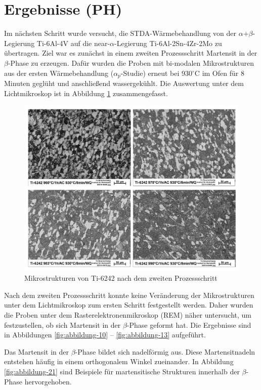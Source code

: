 \section{Ergebnisse (PH)}

Im nächsten Schritt wurde versucht, die STDA-Wärmebehandlung von der $\alpha$+$\beta$-Legierung Ti-6Al-4V auf die near-$\alpha$-Legierung Ti-6Al-2Sn-4Zr-2Mo zu übertragen. Ziel war es zunächst in einem zweiten Prozessschritt Martensit in der $\beta$-Phase zu erzeugen. Dafür wurden die Proben mit bi-modalen Mikrostrukturen aus der ersten Wärmebehandlung ($\alpha_p$-Studie) erneut bei 930$^\circ$C im Ofen für 8 Minuten geglüht und anschließend wassergekühlt. Die Auswertung unter dem Lichtmikroskop ist in Abbildung \ref{fig:abbildung-9} zusammengefasst.

\begin{figure}
	\centering
	\includegraphics[width=0.9\linewidth]{./Bilder/Abbildung 9.png}
	\caption[Abbildung 9]{Mikrostrukturen von Ti-6242 nach dem zweiten Prozessschritt}
	\label{fig:abbildung-9}
\end{figure}

Nach dem zweiten Prozessschritt konnte keine Veränderung der Mikrostrukturen unter dem Lichtmikroskop zum ersten Schritt festgestellt werden. Daher wurden die Proben unter dem Rasterelektronenmikroskop (REM) näher untersucht, um festzustellen, ob sich Martensit in der $\beta$-Phase geformt hat. Die Ergebnisse sind in Abbildungen \ref{fig:abbildung-10} -- \ref{fig:abbildung-13} aufgeführt. 

Das Martensit in der $\beta$-Phase bildet sich nadelförmig aus. Diese Martensitnadeln entstehen häufig in einem orthogonalem Winkel zueinander. In Abbildung \ref{fig:abbildung-21} sind Beispiele für martensitische Strukturen innerhalb der $\beta$-Phase hervorgehoben.

